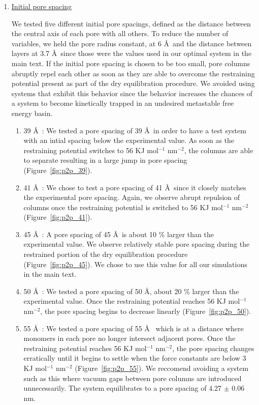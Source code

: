 \documentclass{article}
\begin{document}
  \begin{enumerate}

	  \item \underline{Initial pore spacing}

	  We tested five different initial pore spacings, defined as the
	  distance between the central axis of each pore with all others. To reduce the
	  number of variables, we held the pore radius constant, at 6 \AA~and the
	  distance between layers at 3.7 \AA~since those were the values used in our
	  optimal system in the main text. If the initial pore spacing is chosen to be
	  too small, pore columns abruptly repel each other as soon as they are able to
	  overcome the restraining potential present as part of the dry equilibration
	  procedure. We avoided using systems that exhibit this behavior since the
	  behavior increases the chances of a system to become kinetically trapped in an
	  undesired metastable free energy basin.  

	  \begin{enumerate}

	  	\item 39 \AA~: We tested a pore spacing of 39 \AA~in order to have a test system
		with an intial spacing below the experimental value. As soon as the restraining
		potential switches to 56 KJ mol$^{-1}$ nm$^{-2}$, the columns are able to
		separate resulting in a large jump in pore spacing (Figure~\ref{fig:p2p_39}). 

		\item 41 \AA~: We chose to test a pore spacing of 41 \AA~since
		it closely matches the experimental pore spacing. Again, we observe abrupt
		repulsion of columns once the restraining potential is switched to 56 KJ
		mol$^{-1}$ nm$^{-2}$ (Figure~\ref{fig:p2p_41}).

		\item 45 \AA~: A pore spacing of 45 \AA~is about 10 \% larger than the
		experimental value. We observe relatively stable pore spacing during the
		restrained portion of the dry equilibration procedure
		(Figure~\ref{fig:p2p_45}). We chose to use this value for all our simulations
		in the main text. 

		\item 50 \AA~: We tested a pore spacing of 50 \AA, about 20 \% larger than the
		experimental value. Once the restraining potential reaches 56 KJ mol$^{-1}$
		nm$^{-2}$, the pore spacing begins to decrease linearly (Figure~\ref{fig:p2p_50}).

		\item 55 \AA~: We tested a pore spacing of 55 \AA~ which is at
		a distance where monomers in each pore no longer intersect adjacent pores. Once
		the restraining potential reaches 56 KJ mol$^{-1}$ nm$^{-2}$, the pore spacing
		changes erratically until it begins to settle when the force constants are
		below 3 KJ mol$^{-1}$ nm$^{-2}$ (Figure~\ref{fig:p2p_55}). We reccomend
		avoiding a system such as this where vacuum gaps between pore columns are
		introduced unnecessarily.  The system equilibrates to a pore spacing of 4.27
		$\pm$ 0.06 nm. 


\end{enumerate}
\end{enumerate}
\end{document}
